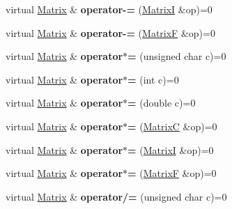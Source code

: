 \begin{DoxyCompactItemize}
\item 
\hypertarget{class_matrix_a53c22fca792845f1d0078f442bb9786c}{virtual \hyperlink{class_matrix}{Matrix} \& {\bfseries operator-\/=} (\hyperlink{class_matrix_i}{Matrix\+I} \&op)=0}\label{class_matrix_a53c22fca792845f1d0078f442bb9786c}

\item 
\hypertarget{class_matrix_ac71bfb0beb519a96df3513ba2b1c0e11}{virtual \hyperlink{class_matrix}{Matrix} \& {\bfseries operator-\/=} (\hyperlink{class_matrix_f}{Matrix\+F} \&op)=0}\label{class_matrix_ac71bfb0beb519a96df3513ba2b1c0e11}

\item 
\hypertarget{class_matrix_afa791a1325be94253d077c72587414af}{virtual \hyperlink{class_matrix}{Matrix} \& {\bfseries operator$\ast$=} (unsigned char c)=0}\label{class_matrix_afa791a1325be94253d077c72587414af}

\item 
\hypertarget{class_matrix_a223e4cad1823333d357e6fbe504ba64f}{virtual \hyperlink{class_matrix}{Matrix} \& {\bfseries operator$\ast$=} (int c)=0}\label{class_matrix_a223e4cad1823333d357e6fbe504ba64f}

\item 
\hypertarget{class_matrix_a0303069017860e65798c5d763d663c61}{virtual \hyperlink{class_matrix}{Matrix} \& {\bfseries operator$\ast$=} (double c)=0}\label{class_matrix_a0303069017860e65798c5d763d663c61}

\item 
\hypertarget{class_matrix_a242addf669116a19d4d5da1b9140f10b}{virtual \hyperlink{class_matrix}{Matrix} \& {\bfseries operator$\ast$=} (\hyperlink{class_matrix_c}{Matrix\+C} \&op)=0}\label{class_matrix_a242addf669116a19d4d5da1b9140f10b}

\item 
\hypertarget{class_matrix_aa35db91d839f617c7d919113ecc855b0}{virtual \hyperlink{class_matrix}{Matrix} \& {\bfseries operator$\ast$=} (\hyperlink{class_matrix_i}{Matrix\+I} \&op)=0}\label{class_matrix_aa35db91d839f617c7d919113ecc855b0}

\item 
\hypertarget{class_matrix_a6af04c2c2b6c6806c90eafc5c6a71a2c}{virtual \hyperlink{class_matrix}{Matrix} \& {\bfseries operator$\ast$=} (\hyperlink{class_matrix_f}{Matrix\+F} \&op)=0}\label{class_matrix_a6af04c2c2b6c6806c90eafc5c6a71a2c}

\item 
\hypertarget{class_matrix_a3a65298c60f5fdf8f287ec09c4098108}{virtual \hyperlink{class_matrix}{Matrix} \& {\bfseries operator/=} (unsigned char c)=0}\label{class_matrix_a3a65298c60f5fdf8f287ec09c4098108}


\end{DoxyCompactItemize}
